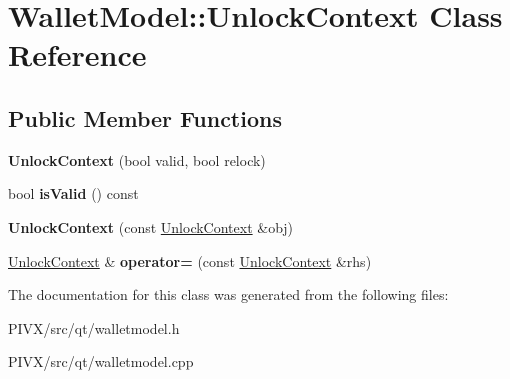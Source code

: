 \hypertarget{class_wallet_model_1_1_unlock_context}{}\section{Wallet\+Model\+:\+:Unlock\+Context Class Reference}
\label{class_wallet_model_1_1_unlock_context}
\subsection*{Public Member Functions}
\begin{DoxyCompactItemize}
\item 
\mbox{\label{class_wallet_model_1_1_unlock_context_aad26e29e6036b7101554361e0a38942d}} 
{\bfseries Unlock\+Context} (bool valid, bool relock)
\item 
\mbox{\label{class_wallet_model_1_1_unlock_context_af78f7b7743056a19a461db84c6de2901}} 
bool {\bfseries is\+Valid} () const
\item 
\mbox{\label{class_wallet_model_1_1_unlock_context_afad6dc72ce1f4af4989efd2aed155759}} 
{\bfseries Unlock\+Context} (const \mbox{\hyperlink{class_wallet_model_1_1_unlock_context}{Unlock\+Context}} \&obj)
\item 
\mbox{\label{class_wallet_model_1_1_unlock_context_a8cdc737caa53323e9bff4e22ea20f440}} 
\mbox{\hyperlink{class_wallet_model_1_1_unlock_context}{Unlock\+Context}} \& {\bfseries operator=} (const \mbox{\hyperlink{class_wallet_model_1_1_unlock_context}{Unlock\+Context}} \&rhs)
\end{DoxyCompactItemize}


The documentation for this class was generated from the following files\+:\begin{DoxyCompactItemize}
\item 
P\+I\+V\+X/src/qt/walletmodel.\+h\item 
P\+I\+V\+X/src/qt/walletmodel.\+cpp\end{DoxyCompactItemize}
